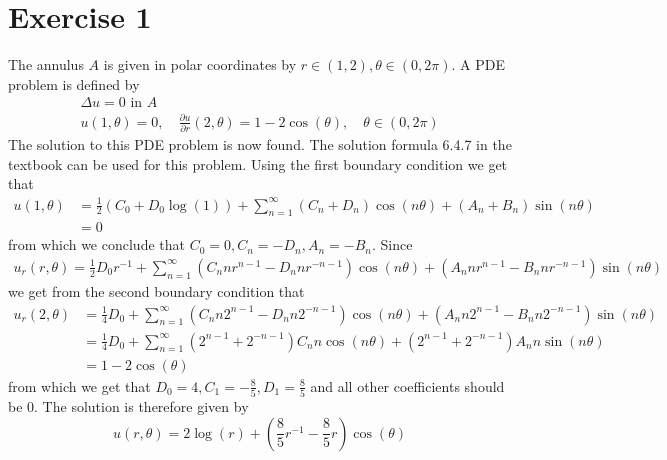 \def\homeworknumber{3}
\def\homeworkdate{25-10-2011}




    \maketitle

    \section*{Exercise 1}
    The annulus $A$ is given in polar coordinates by $r\in(1,2), \theta\in(0,2\pi)$. A PDE problem is defined by
    \begin{gather}
        \Delta u = 0 \text{ in }A \\
        u(1,\theta) = 0,\quad \frac{\partial u}{\partial r}(2,\theta) = 1 - 2\cos(\theta),\quad \theta\in(0,2\pi)
    \end{gather}
    The solution to this PDE problem is now found. The solution formula 6.4.7 in the textbook can be used for this problem. Using the first boundary condition we get that
    \begin{align*}
        u(1,\theta) &= \frac{1}{2}(C_0 + D_0\log(1)) + \sum_{n=1}^\infty (C_n+D_n)\cos(n\theta) + (A_n+B_n)\sin(n\theta) \\
        &= 0
    \end{align*}
    from which we conclude that $C_0=0, C_n=-D_n, A_n=-B_n$. Since
    \begin{align*}
        u_r(r, \theta) = \frac{1}{2}D_0r^{-1} + \sum_{n=1}^\infty (C_n n r^{n-1} - D_n n r^{-n-1})\cos(n\theta) + (A_n n r^{n-1} - B_n n r^{-n-1})\sin(n\theta)
    \end{align*}
    we get from the second boundary condition that
    \begin{align*}
        u_r(2, \theta) &= \frac{1}{4}D_0 + \sum_{n=1}^\infty (C_n n 2^{n-1} - D_n n 2^{-n-1})\cos(n\theta) + (A_n n 2^{n-1} - B_n n 2^{-n-1})\sin(n\theta) \\
        &= \frac{1}{4}D_0 + \sum_{n=1}^\infty (2^{n-1} + 2^{-n-1})C_n n \cos(n\theta) + (2^{n-1} + 2^{-n-1})A_n n \sin(n\theta) \\
        &= 1 - 2\cos(\theta)
    \end{align*}
    from which we get that $D_0=4, C_1=-\frac{8}{5}, D_1=\frac{8}{5}$ and all other coefficients should be 0. The solution is therefore given by
    \begin{equation*}
        u(r, \theta) = 2\log{(r)} + (\frac{8}{5}r^{-1} - \frac{8}{5}r)\cos(\theta)
    \end{equation*}
